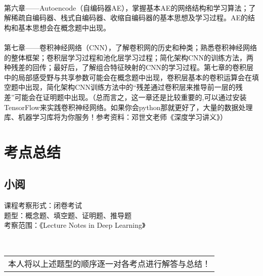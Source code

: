 \documentclass[UFT8]{ctexart}
\begin{document}
~\\
\qquad 第六章——Autoencode（自编码器AE），掌握基本AE的网络结构和学习算法；了解稀疏自编码器、栈式自编码器、收缩自编码器的基本思想及学习过程。AE的结构和基本思想会在概念题中出现。\\
~\\
\qquad 第七章——卷积神经网络（CNN），了解卷积网的历史和种类；熟悉卷积神经网络的整体框架；卷积层学习过程和池化层学习过程；简化架构CNN的训练方法，两种残差的回传；最好后，了解组合特征映射的CNN的学习过程。第七章的卷积层中的局部感受野与共享参数可能会在概念题中出现，卷积层基本的卷积运算会在填空题中出现，简化架构CNN训练方法中的“残差通过卷积层来推导前一层的残差”可能会在证明题中出现。（总而言之，这一章还是比较重要的,可以通过安装TensorFlow来实践卷积神经网络。如果你会python那就更好了，大量的数据处理库、机器学习库将为你服务！参考资料：邓世文老师《深度学习讲义》）\newpage
\section{考点总结}
\subsection{小阅} 
\begin{flushleft}
课程考察形式：闭卷考试 \\
题型：概念题、填空题、证明题、推导题\\
考察范围：《Lecture Notes in Deep Learning》\\
\end{flushleft}
~\\
\begin{center}
\begin{tabular}{@{} l @{}}
\hline
本人将以上述题型的顺序逐一对各考点进行解答与总结！\\
\end{tabular}
\end{center}
\end{document}
